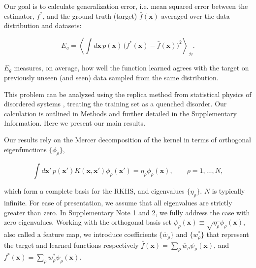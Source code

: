 \documentclass[11pt]{article}
\def\x{{\mathbf x}}
\begin{document}
Our goal is to calculate generalization error, i.e. mean squared error between the estimator, $f^*$, and the ground-truth (target) $\bar f(\mathbf{x})$ averaged over the data distribution and datasets:
\begin{linenomath*}\begin{equation}\label{eq:genError}
    E_g = \left< \int d\x \, p(\x)\,\big(f^*(\x) - \bar f(\mathbf{x})\big)^2 \right>_\mathcal{D}.
\end{equation}\end{linenomath*}
$E_g$ measures, on average, how well the function learned agrees with the target on previously unseen (and seen) data sampled from the same distribution. 

This problem can be analyzed using the replica method from statistical physics of disordered systems \cite{mezard1987spin}, treating the training set as a quenched disorder. Our calculation is outlined in Methods and further detailed in the Supplementary Information. Here we present our main results.

Our results rely on the Mercer decomposition of the kernel in terms of orthogonal eigenfunctions $\{\phi_\rho\}$, 
%
\begin{linenomath*}\begin{equation}\label{eq:eigenvalue}
    \int  d \mathbf{x}'\,p(\mathbf{x}') K(\mathbf{x}, \mathbf{x}') \phi_\rho(\mathbf{x}')  = \eta_\rho \phi_\rho(\mathbf{x}), \qquad \rho = 1,\ldots, N,
\end{equation}\end{linenomath*}
which form a complete basis for the RKHS, and eigenvalues $\{\eta_\rho\}$. $N$ is typically infinite. For ease of presentation, we assume that all eigenvalues are strictly greater than zero. In Supplementary Note 1 and 2, we fully address the case with zero eigenvalues. Working with the orthogonal basis set $\psi_\rho(\mathbf{x}) \equiv \sqrt{\eta_\rho} \phi_\rho(\mathbf{x})$,
 also called a feature map, we introduce coefficients $\{\overline{w}_\rho\}$ and $\{w_\rho^*\}$ that represent the target and learned functions respectively $\bar f(\mathbf{x}) = \sum_\rho \overline{w}_\rho \psi_\rho(\mathbf{x})$, and $f^*(\mathbf{x}) = \sum_\rho w_\rho^* \psi_\rho(\mathbf{x})$.
    
\end{document}
